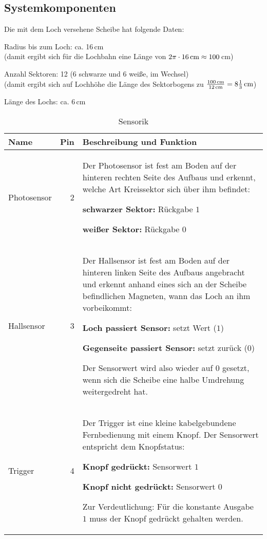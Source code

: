 \documentclass[11pt,a4paper]{scrartcl}
\newcommand{\tablewidth}{.9\textwidth}
\begin{document}
\subsection{Systemkomponenten}
Die mit dem Loch versehene Scheibe hat folgende Daten:
\begin{compactitem}
	\item Radius bis zum Loch: ca. 16\,cm\\
			(damit ergibt sich für die Lochbahn eine Länge von $2\pi\cdot16\text{\,cm} \approx 100$\,cm)
	\item Anzahl Sektoren: 12 (6 schwarze und 6 weiße, im Wechsel)\\
			(damit ergibt sich auf Lochhöhe die Länge des Sektorbogens zu $\frac{100\text{\,cm}}{12\text{\,cm}} = 8\frac{1}{3}\text{\,cm}$)
	\item Länge des Lochs: ca. 6\,cm
\end{compactitem}
\begin{table}[h]
	\centering
	\begin{tabularx}{\tablewidth}{|l|r|X|}
		\hline
		\bfseries Name & \bfseries Pin & \bfseries Beschreibung und Funktion\\\hline\hline
		Photosensor & 2 & Der Photosensor ist fest am Boden auf der hinteren rechten Seite des Aufbaus und erkennt, welche Art Kreissektor sich über ihm befindet:
		\begin{compactitem}
			\item \textbf{schwarzer Sektor:} Rückgabe $1$
			\item \textbf{weißer Sektor:} Rückgabe $0$
		\end{compactitem}
		\\\hline
		Hallsensor & 3 & Der Hallsensor ist fest am Boden auf der hinteren linken Seite des Aufbaus angebracht und erkennt anhand eines sich an der Scheibe befindlichen Magneten, wann das Loch an ihm vorbeikommt:
		\begin{compactitem}
			\item \textbf{Loch passiert Sensor:} setzt Wert ($1$)
			\item \textbf{Gegenseite passiert Sensor:} setzt zurück ($0$)
		\end{compactitem}
		Der Sensorwert wird also wieder auf $0$ gesetzt, wenn sich die Scheibe eine halbe Umdrehung weitergedreht hat.\\\hline
		Trigger & 4 & Der Trigger ist eine kleine kabelgebundene Fernbedienung mit einem Knopf. Der Sensorwert entspricht dem Knopfstatus:
		\begin{compactitem}
			\item \textbf{Knopf gedrückt:} Sensorwert $1$
			\item \textbf{Knopf nicht gedrückt:} Sensorwert $0$
		\end{compactitem}
		Zur Verdeutlichung: Für die konstante Ausgabe $1$ muss der Knopf gedrückt gehalten werden.
		\\\hline
	\end{tabularx}
	\caption{Sensorik}
\end{table}
\end{document}
